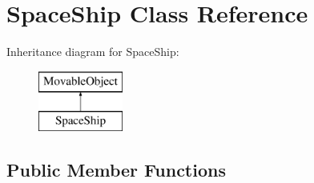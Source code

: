 \hypertarget{classSpaceShip}{\section{Space\-Ship Class Reference}
\label{classSpaceShip}
}
Inheritance diagram for Space\-Ship\-:\begin{figure}[H]
\begin{center}
\leavevmode
\includegraphics[height=2.000000cm]{classSpaceShip}
\end{center}
\end{figure}
\subsection*{Public Member Functions}
